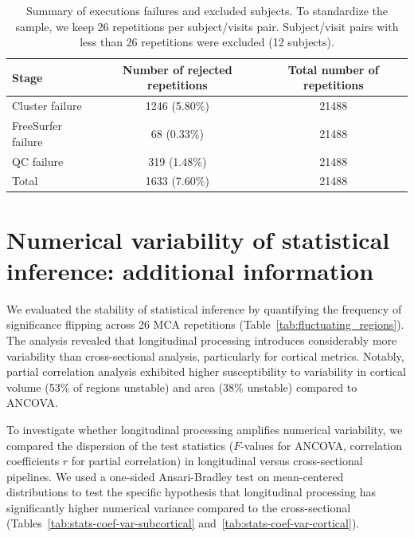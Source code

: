 \begin{table}[h]
    \centering
    \caption{Summary of executions failures and excluded subjects. To standardize
        the sample, we keep 26 repetitions per subject/visits pair.
        Subject/visit pairs with less than 26 repetitions were excluded (12 subjects).}
    \begin{tabular}{l c c}
        \toprule
        \textbf{Stage}     & \textbf{Number of rejected repetitions} &
        \textbf{Total number of repetitions}                                 \\
        \midrule
        Cluster failure    & 1246 (5.80\%)                           & 21488 \\
        FreeSurfer failure & 68 (0.33\%)                             & 21488 \\
        QC failure         & 319 (1.48\%)                            & 21488 \\
        Total              & 1633 (7.60\%)                           & 21488 \\
        \bottomrule
    \end{tabular}\label{tab:qc}
\end{table}

\section{Numerical variability of statistical inference: additional information\label{appendix:summary_stats_inference}}

We evaluated the stability of statistical inference by quantifying the
frequency of significance flipping across 26 MCA repetitions
(Table~\ref{tab:fluctuating_regions}). The analysis revealed that longitudinal
processing introduces considerably more variability than cross-sectional
analysis, particularly for cortical metrics. Notably, partial correlation
analysis exhibited higher susceptibility to variability in cortical volume
(53\% of regions unstable) and area (38\% unstable) compared to ANCOVA\@.

To investigate whether longitudinal processing amplifies numerical variability,
we compared the dispersion of the test statistics ($F$-values for ANCOVA,
correlation coefficients $r$ for partial correlation) in longitudinal versus
cross-sectional pipelines. We used a one-sided Ansari-Bradley test on
mean-centered distributions to test the specific hypothesis that longitudinal
processing has significantly higher numerical variance compared to the
cross-sectional (Tables~\ref{tab:stats-coef-var-subcortical}
and~\ref{tab:stats-coef-var-cortical}).

